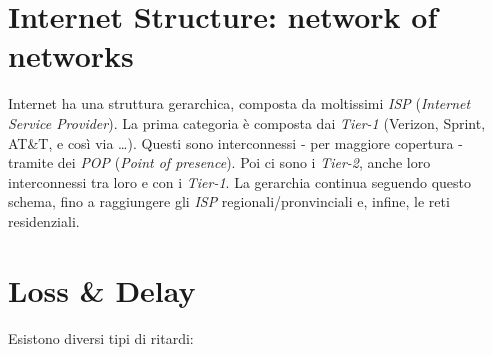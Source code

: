 \section{Internet Structure: network of networks}
Internet ha una struttura gerarchica, composta da moltissimi \textit{ISP} (\textit{Internet Service Provider}).
La prima categoria è composta dai \textit{Tier-1} (Verizon, Sprint, AT\&T, e così via \ldots). Questi sono interconnessi - per maggiore copertura - tramite dei \textit{POP} (\textit{Point of presence}).
Poi ci sono i \textit{Tier-2}, anche loro interconnessi tra loro e con i \textit{Tier-1}.
La gerarchia continua seguendo questo schema, fino a raggiungere gli \textit{ISP} regionali/pronvinciali e, infine, le reti residenziali.

\section{Loss \& Delay}
Esistono diversi tipi di ritardi:
